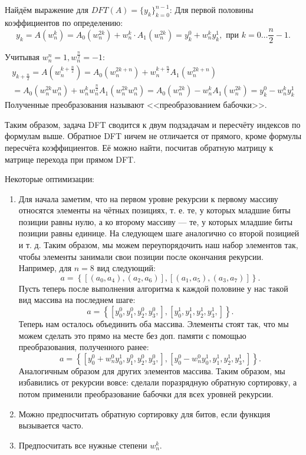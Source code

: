 Найдём выражение для $DFT(A) = \{ y_{k} \}_{k=0}^{n-1}$:
Для первой половины коэффициентов по определению:
\[
  y_{k} = A(w_{n}^{k}) = A_0(w_{n}^{2k}) + w_{n}^{k} \cdot A_1(w_{n}^{2k}) = y_{k}^{0} + w_{n}^{k} y_{k}^1, 
  \text{ при } k = 0\ldots \frac{n}{2} - 1
.\] 

Учитывая $w_{n}^{n} = 1, w_{n}^{\frac{n}{2}} = -1$:
\begin{multline*}
  y_{k + \frac{n}{2}} = A\left(w_{n}^{k + \frac{n}{2}}\right) = A_0(w_{n}^{2k+n}) + w_{n}^{k+\frac{n}{2}} 
  A_1(w_{n}^{2k+n}) \\= A_0(w_{n}^{2k} w_{n}^{n}) + w_{n}^{k} w_{n}^{\frac{n}{2}} A_1(w_{n}^{2k} w_{n}^{n}) =
  A_0(w_{n}^{2k}) - w_{n}^{k} A_1(w_{n}^{2k}) = y_{k}^{0} - w_{n}^{k} y_{k}^{1}
\end{multline*}
Полученные преобразования называют <<преобразованием бабочки>>.

Таким образом, задача DFT сводится к двум подзадачам и пересчёту индексов по формулам выше.
Обратное DFT ничем не отличается от прямого, кроме формулы пересчёта коэффициентов.
Её можно найти, посчитав обратную матрицу к матрице перехода при прямом DFT.

Некоторые оптимизации:
\begin{enumerate}
  \item Для начала заметим, что на первом уровне рекурсии к первому массиву относятся элементы на чётных
    позициях, т. е. те, у которых младшие биты позиции равны нулю, а ко второму массиву --- те, у которых
    младшие биты позиции равны единице. На следующем шаге аналогично со второй позицией и т. д. Таким образом,
    мы можем переупорядочить наш набор элементов так, чтобы элементы занимали свои позиции после окончания
    рекурсии. Например, для $n = 8$ вид следующий:
    \[
      a = \left\{ \left[ \left( a_0, a_4 \right), \left( a_2, a_6 \right)   \right], \left[ \left( a_1, a_5 \right), \left( a_3, a_7 \right)   \right]   \right\} 
    .\] 
    Пусть теперь после выполнения алгоритма к каждой половине у нас такой вид массива на последнем шаге:
    \[
    a = \left\{ \left[ y_0^0, y_1^0, y_2^0, y_3^0,\right], \left[ y_0^1, y_1^1, y_2^1, y_3^1,\right]  \right\} 
    .\] 
    Теперь нам осталось объединить оба массива. Элементы стоят так, что мы можем сделать это прямо на 
    месте без доп. памяти с помощью преобразования, полученного ранее:
    \[
      a = \left\{ \left[ y_0^0 + w_{n}^{0}y_0^1, y_1^0, y_2^0, y_3^0,\right], \left[ y_0^0 - w_{n}^0 y_0^{1}, y_1^1, y_2^1, y_3^1,\right]  \right\} 
    .\] 
    Аналогичным образом для других элементов массива. Таким образом, мы избавились от рекурсии вовсе: 
    сделали поразрядную обратную сортировку, а потом применили преобразование бабочки для всех уровней
    рекурсии.
  \item Можно предпосчитать обратную сортировку для битов, если функция вызывается часто. 
  \item Предпосчитать все нужные степени $w_{n}^{k}$.
\end{enumerate}

